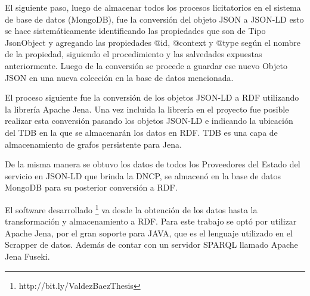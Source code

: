 El siguiente paso, luego de almacenar todos los procesos licitatorios en el sistema de base de datos  (MongoDB), fue la conversión del objeto JSON a JSON-LD esto se hace sistemáticamente identificando las propiedades que son de Tipo JsonObject y agregando las propiedades @id, @context y @type según el nombre de la propiedad, siguiendo el procedimiento y las salvedades expuestas anteriormente. Luego de la conversión se procede a guardar ese nuevo Objeto JSON en una nueva colección en la base de datos mencionada.

El proceso siguiente fue la conversión de los objetos JSON-LD a RDF utilizando la librería Apache Jena. Una vez incluida la librería en el proyecto fue posible realizar esta conversión pasando los objetos JSON-LD e indicando la ubicación del TDB en la que se almacenarán los datos en RDF. TDB es una capa de almacenamiento de grafos persistente para Jena.

De la misma manera se obtuvo los datos de todos los Proveedores del Estado del servicio en JSON-LD que brinda la DNCP, se almacenó en la base de datos MongoDB para su posterior conversión a RDF. 

El software desarrollado \footnote{http://bit.ly/ValdezBaezThesis} va desde la obtención de los datos hasta la transformación y almacenamiento a RDF. Para este trabajo se optó por utilizar Apache Jena, por el gran soporte para JAVA, que es el lenguaje utilizado en el Scrapper de datos. Además de contar con un servidor SPARQL llamado Apache Jena Fuseki.


